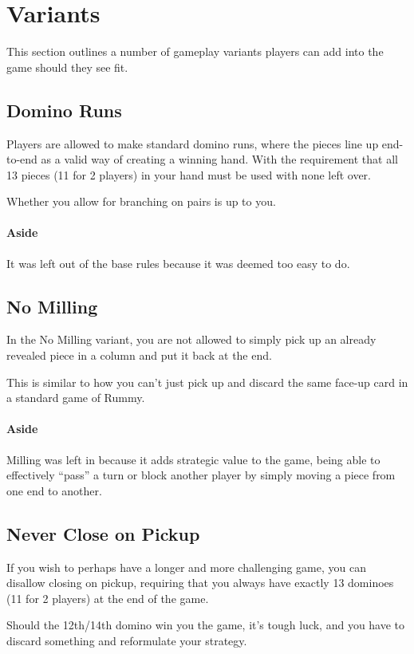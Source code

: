 \section{Variants}\label{sec:variants}
This section outlines a number of gameplay variants players can add into the game should they see fit.
\subsection{Domino Runs}
Players are allowed to make standard domino runs, where the pieces line up end-to-end as a valid way of creating a winning hand. With the requirement that all 13 pieces (11 for 2 players) in your hand must be used with none left over.

Whether you allow for branching on pairs is up to you.

\paragraph{Aside} It was left out of the base rules because it was deemed too easy to do.

\subsection{No Milling}
In the No Milling variant, you are not allowed to simply pick up an already revealed piece in a column and put it back at the end.

This is similar to how you can't just pick up and discard the same face-up card in a standard game of Rummy.

\paragraph{Aside} Milling was left in because it adds strategic value to the game, being able to effectively ``pass'' a turn or block another player by simply moving a piece from one end to another.

\subsection{Never Close on Pickup}
If you wish to perhaps have a longer and more challenging game, you can disallow closing on pickup, requiring that you always have exactly 13 dominoes (11 for 2 players) at the end of the game.

Should the 12th/14th domino win you the game, it's tough luck, and you have to discard something and reformulate your strategy.

